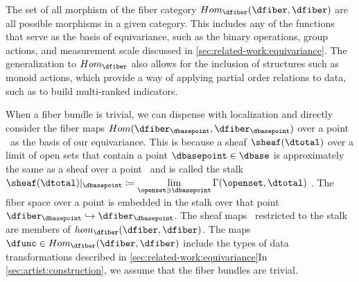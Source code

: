 \documentclass[10pt,journal,compsoc]{IEEEtran}
\theoremstyle{definition}
\theoremstyle{remark}
\begin{document}
The set of all morphism of the fiber category $Hom_{\mathcal{\dfiber}}(\dfiber, \dfiber)$ are all possible morphisms in a given category. This includes any of the functions that serve as the basis of equivariance, such as the binary operations, group actions, and measurement scale discussed in  \autoref{sec:related-work:equivariance}. The generalization to $Hom_\mathcal{\dfiber}$ also allows for the inclusion of structures such as monoid actions\cite{barrCategoryTheoryComputing}, which provide a way of applying partial order relations to data\cite{fongInvitationAppliedCategory2019}, such as to build multi-ranked indicators\cite{bruggemannRankingPrioritizationMultiindicator2011}.


When a fiber bundle is trivial, we can dispense with localization and directly consider the fiber maps $Hom(\dfiber_{\dbasepoint}, \dfiber_{\dbasepoint})$ over a point \dbasepoint\ as the basis of our equivariance. This is because a sheaf $\sheaf(\dtotal)$ over a limit of open sets that contain a point $\dbasepoint \in \dbase$ is approximately the same as a sheaf over a point \dbasepoint\ and is called the stalk $\sheaf(\dtotal)|_{\dbasepoint}\coloneqq \lim\limits_{\openset\ni \dbasepoint} \Gamma(\openset, \dtotal)$ \cite{StalkSheaf2019}. The fiber space over a point is embedded in the stalk over that point $\dfiber_{\dbasepoint}\hookrightarrow \mathscr{\dfiber}_{\dbasepoint}$. The sheaf maps \dfunc\ restricted to the stalk are members of $hom_{\mathcal{\dfiber}}(\dfiber,\dfiber)$. The maps $\dfunc \in Hom_{\mathcal{\dfiber}}(\dfiber,\dfiber)$ include the types of data transformations described in \autoref{sec:related-work:equivariance}In \autoref{sec:artist:construction}, we assume that the fiber bundles are trivial.
\end{document}
